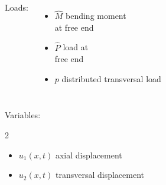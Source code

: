 \documentclass[aspectratio=169]{beamer}
\begin{document}
\begin{frame}
\begin{columns}
    {\tiny Loads:
      \begin{itemize}\setlength\itemsep{0.05em}
        \item  $\hat M$  bending moment \\ at free end
        \item  $\hat P$ load at \\ free end
        \item $p$ distributed transversal load
      \end{itemize}
    }
  \end{columns}
  \begin{block}{Variables:}
    \begin{multicols}{2}
      \begin{itemize}\setlength\itemsep{0.05em}
        \item $u_{1}(x,t)$ axial displacement
        \item $u_{2}(x,t)$ transversal displacement\vspace{.1cm}
      \end{itemize}
    \end{multicols}
  \end{block}
\end{frame}
\end{document}
